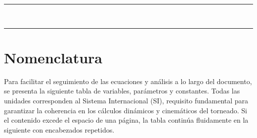 \documentclass[12pt,a4paper]{article}
\begin{document}
\begingroup
\hypersetup{linkcolor=black}
\linespread{0.95}\selectfont
{\color{black}\rule{\textwidth}{0.8pt}}\\[2pt]
\tableofcontents
{\color{black}\rule{\textwidth}{0.8pt}}
\endgroup
\clearpage

\begingroup
\hypersetup{linkcolor=black}
\small
\linespread{0.85}\selectfont
\setlength{\parskip}{0pt}
\setlength{\cftbeforefigskip}{0.5pt}
\setlength{\cftbeforetabskip}{0.8pt}
\let\clearpage\relax
\listoffigures
\vspace{0.5cm}
\listoftables
\endgroup
\clearpage

\section{Nomenclatura}
Para facilitar el seguimiento de las ecuaciones y análisis a lo largo del documento, se presenta la siguiente tabla de variables, parámetros y constantes. Todas las unidades corresponden al Sistema Internacional (SI), requisito fundamental para garantizar la coherencia en los cálculos dinámicos y cinemáticos del torneado. Si el contenido excede el espacio de una página, la tabla continúa fluidamente en la siguiente con encabezados repetidos.
\end{document}
